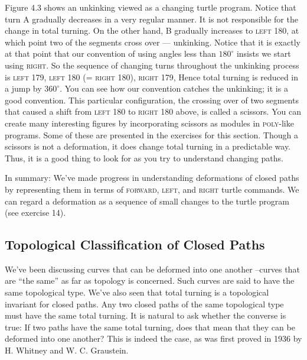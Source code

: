 \documentclass{book}
\begin{document}
Figure 4.3 shows an unkinking viewed as a changing turtle program.
Notice that turn A gradually decreases in a very regular manner. It is
not responsible for the change in total turning. On the other hand, B
gradually increases to \textsc{left} 180, at which point two of the segments
cross over --- unkinking. Notice that it is exactly at that point that our
convention of using angles less than $180^{\circ}$ insists we start using \textsc{right}.
So the sequence of changing turns throughout the unkinking process is
\textsc{left} 179, \textsc{left} 180 (= \textsc{right} 180), \textsc{right} 179,
Hence total turning is reduced in a jump by $360^{\circ}$. You can see how
our convention catches the unkinking; it is a good convention. This
particular configuration, the crossing over of two segments that caused
a shift from \textsc{left} 180 to \textsc{right} 180 above, is called a scissors. You can
create many interesting figures by incorporating scissors as modules in
\textsc{poly}-like programs. Some of these are presented in the exercises for this
section. Though a scissors is not a deformation, it does change total
turning in a predictable way. Thus, it is a good thing to look for as you
try to understand changing paths.

In summary: We've made progress in understanding deformations of
closed paths by representing them in terms of \textsc{forward}, \textsc{left}, and \textsc{right}
turtle commands. We can regard a deformation as a sequence of small
changes to the turtle program (see exercise 14).

\subsection{Topological Classification of Closed Paths}

We've been discussing curves that can be deformed into one another --curves that are ``the same'' as far as topology is concerned. Such curves
are said to have the same topological type. We've also seen that total
turning is a topological invariant for closed paths. Any two closed paths
of the same topological type must have the same total turning. It is
natural to ask whether the converse is true: If two paths have the
same total turning, does that mean that they can be deformed into one
another? This is indeed the case, as was first proved in 1936 by H.
Whitney and W. C. Graustein.
\end{document}
